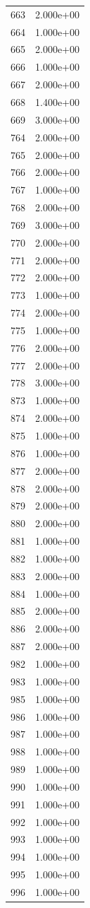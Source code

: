\documentclass[12pt]{article}
\begin{document}
\begin{longtable}{@{}cc@{}}
663 & 2.000e+00 \\
664 & 1.000e+00 \\
665 & 2.000e+00 \\
666 & 1.000e+00 \\
667 & 2.000e+00 \\
668 & 1.400e+00 \\
669 & 3.000e+00 \\
764 & 2.000e+00 \\
765 & 2.000e+00 \\
766 & 2.000e+00 \\
767 & 1.000e+00 \\
768 & 2.000e+00 \\
769 & 3.000e+00 \\
770 & 2.000e+00 \\
771 & 2.000e+00 \\
772 & 2.000e+00 \\
773 & 1.000e+00 \\
774 & 2.000e+00 \\
775 & 1.000e+00 \\
776 & 2.000e+00 \\
777 & 2.000e+00 \\
778 & 3.000e+00 \\
873 & 1.000e+00 \\
874 & 2.000e+00 \\
875 & 1.000e+00 \\
876 & 1.000e+00 \\
877 & 2.000e+00 \\
878 & 2.000e+00 \\
879 & 2.000e+00 \\
880 & 2.000e+00 \\
881 & 1.000e+00 \\
882 & 1.000e+00 \\
883 & 2.000e+00 \\
884 & 1.000e+00 \\
885 & 2.000e+00 \\
886 & 2.000e+00 \\
887 & 2.000e+00 \\
982 & 1.000e+00 \\
983 & 1.000e+00 \\
985 & 1.000e+00 \\
986 & 1.000e+00 \\
987 & 1.000e+00 \\
988 & 1.000e+00 \\
989 & 1.000e+00 \\
990 & 1.000e+00 \\
991 & 1.000e+00 \\
992 & 1.000e+00 \\
993 & 1.000e+00 \\
994 & 1.000e+00 \\
995 & 1.000e+00 \\
996 & 1.000e+00 \\

\bottomrule
\end{longtable}
\end{document}
